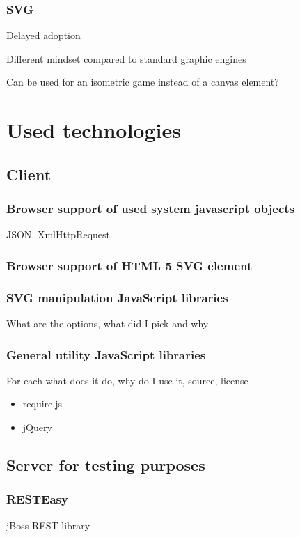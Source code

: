 \documentclass[11pt,oneside, final]{fithesis2}
\begin{document}
\subsection{SVG}
Delayed adoption

Different mindset compared to standard graphic engines

Can be used for an isometric game instead of a canvas element?

\chapter{Used technologies}
\section{Client}

\subsection{Browser support of used system javascript objects}
JSON, XmlHttpRequest

\subsection{Browser support of HTML 5 SVG element}

\subsection{SVG manipulation JavaScript libraries}

What are the options, what did I pick and why

\subsection{General utility JavaScript libraries}
For each what does it do, why do I use it, source, license
\begin{itemize}
	\item require.js
	\item jQuery
\end{itemize}

\section{Server for testing purposes}
\subsection{RESTEasy}
jBoss REST library
\end{document}
